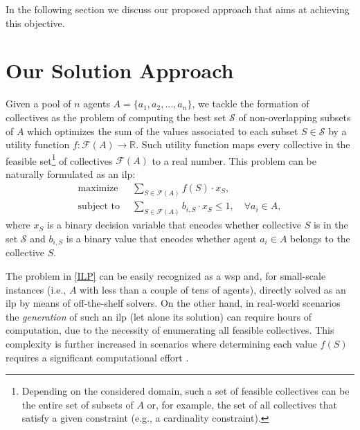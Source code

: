 \documentclass{article}
\theoremstyle{definition}
\begin{document}
In the following section we discuss our proposed approach that aims at achieving this objective.

\section{Our Solution Approach}
\label{sec:ourapproach}

Given a pool of $n$ agents $A = \{a_1, a_2, \ldots, a_n\}$, we tackle the formation of collectives as the problem of computing the best set $\mathcal{S}$ of non-overlapping subsets of $A$ which optimizes the sum of the values associated to each subset $S\in\mathcal{S}$ by a utility function $f : \mathcal{F}(A) \to \mathbb{R}$. Such utility function maps every collective in the feasible set\footnote{Depending on the considered domain, such a set of feasible collectives can be the entire set of subsets of $A$ or, for example, the set of all collectives that satisfy a given constraint (e.g., a cardinality constraint).} of collectives $\mathcal{F}(A)$ to a real number.
This problem can be naturally formulated as an \gls{ilp}:
\begin{equation}\label{ILP}
\begin{aligned}
    \mbox{maximize} \enspace & \sum_{S \in \mathcal{F}(A)} f(S) \cdot x_S,\\
    \mbox{subject to} \enspace & \sum_{S \in \mathcal{F}(A)} b_{i,S} \cdot x_S \leq 1, \quad \forall a_i \in A,
\end{aligned}
\end{equation}
where $x_S$ is a binary decision variable that encodes whether collective $S$ is in the set $\mathcal{S}$ and $b_{i,S}$ is a binary value that encodes whether agent $a_i \in A$ belongs to the collective $S$.

The problem in \eqref{ILP} can be easily recognized as a \gls{wsp} and, for small-scale instances (i.e., $A$ with less than a couple of tens of agents), directly solved as an \gls{ilp} by means of off-the-shelf solvers.
On the other hand, in real-world scenarios the \emph{generation} of such an \gls{ilp} (let alone its solution) can require hours of computation, due to the necessity of enumerating all feasible collectives. This complexity is further increased in scenarios where determining each value $f(S)$ requires a significant computational effort \cite{andrejczuk2019synergistic}.
\end{document}
